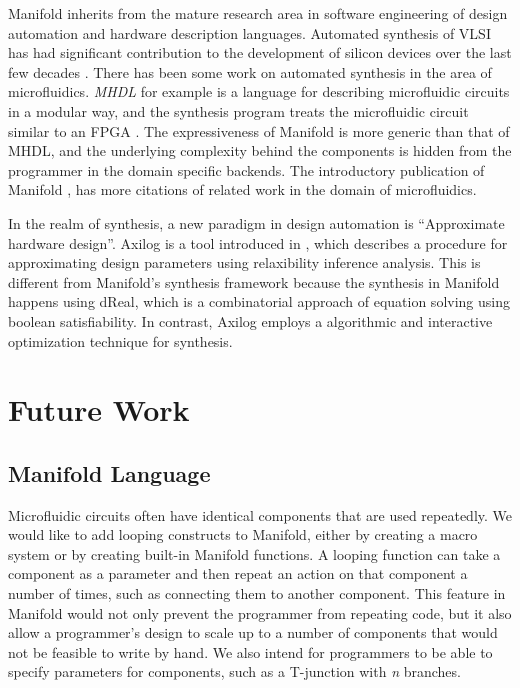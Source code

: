 Manifold inherits from the mature research area in software engineering of
design automation and hardware description languages. Automated synthesis of VLSI has had
significant contribution to the development of silicon devices over the last few decades
\cite{MeadConway80}. There has been some work on automated synthesis in the area of microfluidics.
\emph{MHDL} for example is a language for describing microfluidic circuits in a modular way, and the
synthesis program treats the microfluidic circuit similar to an FPGA \cite{McDaniel13aspdac}. The
expressiveness of Manifold is more generic than that of MHDL, and the underlying complexity behind
the components is hidden from the programmer in the domain specific backends. The introductory
publication of Manifold \cite{Berzish16cascon}, has more citations of related work in the domain of
microfluidics.

In the realm of synthesis, a new paradigm in design automation is ``Approximate hardware design''.
Axilog is a tool introduced in \cite{axilog}, which describes a procedure for approximating design
parameters using relaxibility inference analysis. This is different from Manifold's synthesis
framework because the synthesis in Manifold happens using dReal, which is a combinatorial approach
of equation solving using boolean satisfiability. In contrast, Axilog employs a algorithmic and
interactive optimization technique for synthesis.

\section{Future Work}

\subsection{Manifold Language}

Microfluidic circuits often have identical components that are used repeatedly.
We would like to add looping constructs to Manifold, either by creating a
macro system or by creating built-in Manifold functions. A looping function
can take a component as a parameter and then repeat an action on that
component a number of times, such as connecting them to another component.
This feature in Manifold would not only prevent the programmer from repeating
code, but it also allow a programmer's design to scale up to a number of
components that would not be feasible to write by hand. We also intend for
programmers to be able to specify parameters for components, such as a T-junction with \emph{n} branches.

